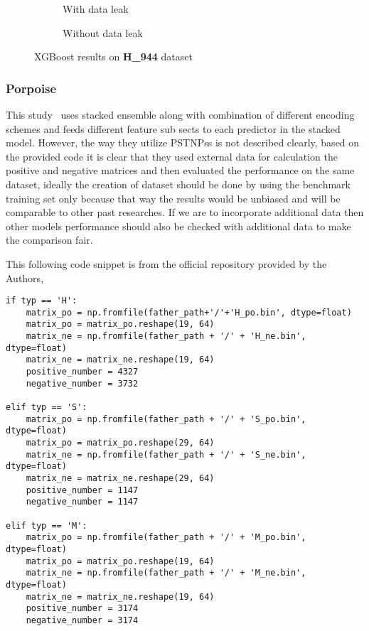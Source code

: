         \begin{figure}[H]
            \centering
            \begin{subfigure}{0.47\textwidth}
              \centering
              \resizebox{\textwidth}{!}{}
              \captionsetup{justification=centering}
              \caption{With data leak}
            \end{subfigure}%
            \hspace{0.05\textwidth}
            \begin{subfigure}{0.47\textwidth}
              \centering
              \resizebox{\textwidth}{!}{}
              \captionsetup{justification=centering}
              \caption{Without data leak}
            \end{subfigure}
            \caption{XGBoost results on \textbf{H\_944} dataset}\label{fig:xgb_m944}
        \end{figure}

    \subsubsection{Porpoise}
      This study~\cite{li_porpoise_2021} uses stacked ensemble along with combination of different encoding schemes and feeds different feature sub sects to each predictor in the stacked model.
      However, the way they utilize PSTNPss is not described clearly, based on the provided code it is clear that they used external data for calculation the positive and negative matrices and then evaluated the performance on the same dataset, ideally the creation of dataset should be done by using the benchmark training set only because that way the results would be unbiased and will be comparable to other past researches.
      If we are to incorporate additional data then other models performance should also be checked with additional data to make the comparison fair.

      This following code snippet is from the official repository provided by the Authors,
      \begin{lstlisting}[caption={Porpoise PSTNPss implementation \(lines 39\textminus{61}\)},label={lst:porpoise-pstnpss}]
if typ == 'H':
    matrix_po = np.fromfile(father_path+'/'+'H_po.bin', dtype=float)
    matrix_po = matrix_po.reshape(19, 64)
    matrix_ne = np.fromfile(father_path + '/' + 'H_ne.bin', dtype=float)
    matrix_ne = matrix_ne.reshape(19, 64)
    positive_number = 4327
    negative_number = 3732

elif typ == 'S':
    matrix_po = np.fromfile(father_path + '/' + 'S_po.bin', dtype=float)
    matrix_po = matrix_po.reshape(29, 64)
    matrix_ne = np.fromfile(father_path + '/' + 'S_ne.bin', dtype=float)
    matrix_ne = matrix_ne.reshape(29, 64)
    positive_number = 1147
    negative_number = 1147

elif typ == 'M':
    matrix_po = np.fromfile(father_path + '/' + 'M_po.bin', dtype=float)
    matrix_po = matrix_po.reshape(19, 64)
    matrix_ne = np.fromfile(father_path + '/' + 'M_ne.bin', dtype=float)
    matrix_ne = matrix_ne.reshape(19, 64)
    positive_number = 3174
    negative_number = 3174
      \end{lstlisting}

